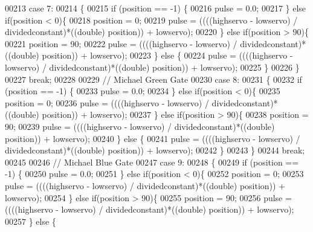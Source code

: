 \begin{DoxyCode}
00213         \textcolor{keywordflow}{case} 7:
00214         \{
00215             \textcolor{keywordflow}{if} (position == -1) \{
00216                 pulse = 0.0;
00217             \} \textcolor{keywordflow}{else} \textcolor{keywordflow}{if}(position < 0)\{
00218                 position = 0;
00219                 pulse = ((((highservo - lowservo) / dividedconstant)*((double) position)) + lowservo);
00220             \} \textcolor{keywordflow}{else} \textcolor{keywordflow}{if}(position > 90)\{
00221                 position = 90;
00222                 pulse = ((((highservo - lowservo) / dividedconstant)*((double) position)) + lowservo);
00223             \} \textcolor{keywordflow}{else} \{
00224                 pulse = ((((highservo - lowservo) / dividedconstant)*((double) position)) + lowservo);
00225             \}
00226         \}
00227             \textcolor{keywordflow}{break};
00228 
00229             \textcolor{comment}{// Michael Green Gate}
00230         \textcolor{keywordflow}{case} 8:
00231         \{
00232             \textcolor{keywordflow}{if} (position == -1) \{
00233                 pulse = 0.0;
00234             \} \textcolor{keywordflow}{else} \textcolor{keywordflow}{if}(position < 0)\{
00235                 position = 0;
00236                 pulse = ((((highservo - lowservo) / dividedconstant)*((double) position)) + lowservo);
00237             \} \textcolor{keywordflow}{else} \textcolor{keywordflow}{if}(position > 90)\{
00238                 position = 90;
00239                 pulse = ((((highservo - lowservo) / dividedconstant)*((double) position)) + lowservo);
00240             \} \textcolor{keywordflow}{else} \{
00241                 pulse = ((((highservo - lowservo) / dividedconstant)*((double) position)) + lowservo);
00242             \}
00243         \}
00244             \textcolor{keywordflow}{break};
00245 
00246             \textcolor{comment}{// Michael Blue Gate}
00247         \textcolor{keywordflow}{case} 9:
00248         \{
00249             \textcolor{keywordflow}{if} (position == -1) \{
00250                 pulse = 0.0;
00251             \} \textcolor{keywordflow}{else} \textcolor{keywordflow}{if}(position < 0)\{
00252                 position = 0;
00253                 pulse = ((((highservo - lowservo) / dividedconstant)*((double) position)) + lowservo);
00254             \} \textcolor{keywordflow}{else} \textcolor{keywordflow}{if}(position > 90)\{
00255                 position = 90;
00256                 pulse = ((((highservo - lowservo) / dividedconstant)*((double) position)) + lowservo);
00257             \} \textcolor{keywordflow}{else} \{

\end{DoxyCode}
